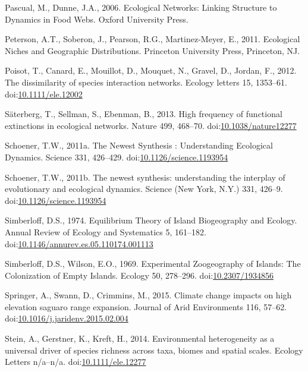\hypertarget{ref-Pascual2006}{}
Pascual, M., Dunne, J.A., 2006. Ecological Networks: Linking Structure
to Dynamics in Food Webs. Oxford University Press.

\hypertarget{ref-Peterson2011}{}
Peterson, A.T., Soberon, J., Pearson, R.G., Martinez-Meyer, E., 2011.
Ecological Niches and Geographic Distributions. Princeton University
Press, Princeton, NJ.

\hypertarget{ref-Poisot2012}{}
Poisot, T., Canard, E., Mouillot, D., Mouquet, N., Gravel, D., Jordan,
F., 2012. The dissimilarity of species interaction networks. Ecology
letters 15, 1353--61.
doi:\href{https://doi.org/10.1111/ele.12002}{10.1111/ele.12002}

\hypertarget{ref-Saterberg2013}{}
Säterberg, T., Sellman, S., Ebenman, B., 2013. High frequency of
functional extinctions in ecological networks. Nature 499, 468--70.
doi:\href{https://doi.org/10.1038/nature12277}{10.1038/nature12277}

\hypertarget{ref-Schoener2011a}{}
Schoener, T.W., 2011a. The Newest Synthesis : Understanding Ecological
Dynamics. Science 331, 426--429.
doi:\href{https://doi.org/10.1126/science.1193954}{10.1126/science.1193954}

\hypertarget{ref-Schoener2011}{}
Schoener, T.W., 2011b. The newest synthesis: understanding the interplay
of evolutionary and ecological dynamics. Science (New York, N.Y.) 331,
426--9.
doi:\href{https://doi.org/10.1126/science.1193954}{10.1126/science.1193954}

\hypertarget{ref-Simberloff1974a}{}
Simberloff, D.S., 1974. Equilibrium Theory of Island Biogeography and
Ecology. Annual Review of Ecology and Systematics 5, 161--182.
doi:\href{https://doi.org/10.1146/annurev.es.05.110174.001113}{10.1146/annurev.es.05.110174.001113}

\hypertarget{ref-Simberloff2016}{}
Simberloff, D.S., Wilson, E.O., 1969. Experimental Zoogeography of
Islands: The Colonization of Empty Islands. Ecology 50, 278--296.
doi:\href{https://doi.org/10.2307/1934856}{10.2307/1934856}

\hypertarget{ref-Springer2015}{}
Springer, A., Swann, D., Crimmins, M., 2015. Climate change impacts on
high elevation saguaro range expansion. Journal of Arid Environments
116, 57--62.
doi:\href{https://doi.org/10.1016/j.jaridenv.2015.02.004}{10.1016/j.jaridenv.2015.02.004}

\hypertarget{ref-Stein2014}{}
Stein, A., Gerstner, K., Kreft, H., 2014. Environmental heterogeneity as
a universal driver of species richness across taxa, biomes and spatial
scales. Ecology Letters n/a--n/a.
doi:\href{https://doi.org/10.1111/ele.12277}{10.1111/ele.12277}

